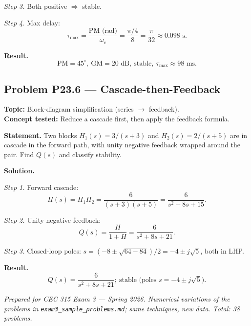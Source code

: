 \documentclass[11pt]{article}
\begin{document}
\textit{Step 3.} Both positive $\Rightarrow$ stable.

\textit{Step 4.} Max delay:
\[
\tau_{\max} = \frac{\text{PM (rad)}}{\omega_{c}} = \frac{\pi/4}{8} = \frac{\pi}{32}\approx 0.098\text{ s}.
\]

\textbf{Result.}
\[
\boxed{\,\text{PM}=45^{\circ},\ \text{GM}=20\text{ dB},\ \text{stable},\ \tau_{\max}\approx 98\text{ ms}.\,}
\]

\subsection{Problem P23.6 --- Cascade-then-Feedback}
\textbf{Topic:} Block-diagram simplification (series $\to$ feedback).\\
\textbf{Concept tested:} Reduce a cascade first, then apply the feedback formula.

\textbf{Statement.} Two blocks $H_{1}(s) = 3/(s+3)$ and $H_{2}(s) = 2/(s+5)$
are in cascade in the forward path, with unity negative feedback wrapped
around the pair. Find $Q(s)$ and classify stability.

\textbf{Solution.}

\textit{Step 1.} Forward cascade:
\[
H(s) = H_{1}H_{2} = \frac{6}{(s+3)(s+5)} = \frac{6}{s^{2}+8s+15}.
\]

\textit{Step 2.} Unity negative feedback:
\[
Q(s) = \frac{H}{1+H} = \frac{6}{s^{2}+8s+21}.
\]

\textit{Step 3.} Closed-loop poles: $s = (-8\pm\sqrt{64-84})/2 = -4\pm j\sqrt{5}$,
both in LHP.

\textbf{Result.}
\[
\boxed{\,Q(s) = \frac{6}{s^{2}+8s+21};\ \text{stable (poles }s=-4\pm j\sqrt{5}\text{).}\,}
\]

\bigskip\bigskip
\noindent\textit{Prepared for CEC 315 Exam 3 --- Spring 2026.
Numerical variations of the problems in \texttt{exam3\_sample\_problems.md};
same techniques, new data. Total: 38 problems.}
\end{document}
